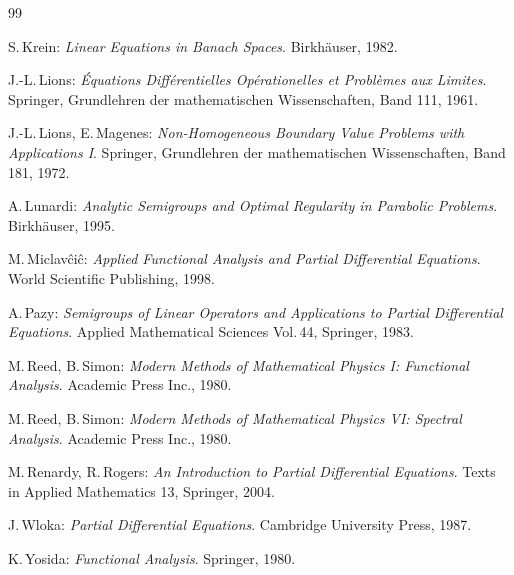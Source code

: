 \documentclass[11pt,twoside]{article}
\begin{document}
\begin{thebibliography}{99}
\begin{small}
  S.\,Krein:
\textit{Linear Equations in Banach Spaces}.
Birk\-h\"{a}user, 1982.

 J.-L.\,Lions:
\textit{\'{E}quations Diff\'{e}rentielles Op\'{e}rationelles et Probl\`{e}mes aux Limites}.
Springer,
Grund\-lehren der mathematischen Wissenschaften, Band 111, 1961.

 J.-L.\,Lions, E.\,Magenes:
\textit{Non-Homogeneous Boundary Value Problems with Applications I}.
Springer, Grund\-lehren der mathematischen Wissenschaften, Band 181, 1972.

  A.\,Lunardi:
\textit{Analytic Semigroups and Optimal Regularity in Parabolic Problems}.
Birk\-h\"{a}user, 1995.

  M.\,Miclav\^{c}i\^{c}:
\textit{Applied Functional Analysis and Partial Differential Equations}.
World Scientific Publishing, 1998.

  A.\,Pazy:
\textit{Semigroups of Linear Operators
        and Applications to Partial Differential Equations}.
Applied Mathematical Sciences Vol.\,44, Springer, 1983.

 M.\,Reed, B.\,Simon:
\textit{Modern Methods of Mathematical Physics I: Functional Analysis}.
Academic Press Inc., 1980.

 M.\,Reed, B.\,Simon:
\textit{Modern Methods of Mathematical Physics VI: Spectral Analysis}.
Academic Press Inc., 1980.

  M.\,Renardy, R.\,Rogers:
\textit{An Introduction to Partial Differential Equations}.
Texts in Applied Mathematics 13, Springer, 2004.

  J.\,Wloka:
\textit{Partial Differential Equations}.
Cambridge University Press, 1987.

  K.\,Yosida:
\textit{Functional Analysis}.
Springer, 1980.
\end{small}
\end{thebibliography}

\end{document}
